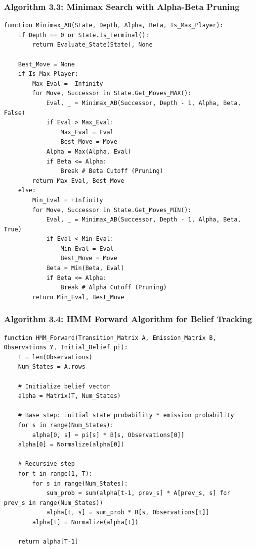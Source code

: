 \documentclass[12pt,a4paper]{report}
\begin{document}
\subsubsection*{Algorithm 3.3: Minimax Search with Alpha-Beta Pruning}

\begin{verbatim}
function Minimax_AB(State, Depth, Alpha, Beta, Is_Max_Player):
    if Depth == 0 or State.Is_Terminal():
        return Evaluate_State(State), None
        
    Best_Move = None
    if Is_Max_Player:
        Max_Eval = -Infinity
        for Move, Successor in State.Get_Moves_MAX():
            Eval, _ = Minimax_AB(Successor, Depth - 1, Alpha, Beta, False)
            if Eval > Max_Eval:
                Max_Eval = Eval
                Best_Move = Move
            Alpha = Max(Alpha, Eval)
            if Beta <= Alpha:
                Break # Beta Cutoff (Pruning)
        return Max_Eval, Best_Move
    else:
        Min_Eval = +Infinity
        for Move, Successor in State.Get_Moves_MIN():
            Eval, _ = Minimax_AB(Successor, Depth - 1, Alpha, Beta, True)
            if Eval < Min_Eval:
                Min_Eval = Eval
                Best_Move = Move
            Beta = Min(Beta, Eval)
            if Beta <= Alpha:
                Break # Alpha Cutoff (Pruning)
        return Min_Eval, Best_Move
\end{verbatim}

\subsubsection*{Algorithm 3.4: HMM Forward Algorithm for Belief Tracking}

\begin{verbatim}
function HMM_Forward(Transition_Matrix A, Emission_Matrix B, Observations Y, Initial_Belief pi):
    T = len(Observations)
    Num_States = A.rows
    
    # Initialize belief vector
    alpha = Matrix(T, Num_States)
    
    # Base step: initial state probability * emission probability
    for s in range(Num_States):
        alpha[0, s] = pi[s] * B[s, Observations[0]]
    alpha[0] = Normalize(alpha[0])
    
    # Recursive step
    for t in range(1, T):
        for s in range(Num_States):
            sum_prob = sum(alpha[t-1, prev_s] * A[prev_s, s] for prev_s in range(Num_States))
            alpha[t, s] = sum_prob * B[s, Observations[t]]
        alpha[t] = Normalize(alpha[t])
        
    return alpha[T-1]
\end{verbatim}
\end{document}
